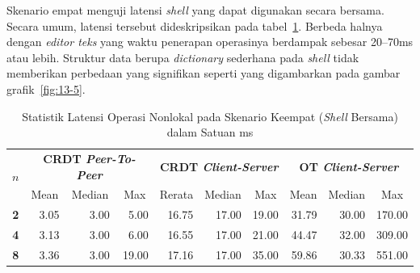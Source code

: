 Skenario empat menguji latensi \textit{shell} yang dapat digunakan secara bersama. Secara umum, latensi tersebut dideskripsikan pada tabel~\ref{tab:latency-4}. Berbeda halnya dengan \textit{editor teks} yang waktu penerapan operasinya berdampak sebesar 20--70ms atau lebih. Struktur data berupa \textit{dictionary} sederhana pada \textit{shell} tidak memberikan perbedaan yang signifikan seperti yang digambarkan pada gambar grafik~\ref{fig:13-5}.

\begin{table}[H]
 \centering
\begin{tabular}{|c|rrr|rrr|rrr|}
\hline
\multirow{2}{*}{$n$} & \multicolumn{3}{c|}{\textbf{CRDT \textit{Peer-To-Peer}}} & \multicolumn{3}{c|}{\textbf{CRDT \textit{Client-Server}}} & \multicolumn{3}{c|}{\textbf{OT \textit{Client-Server}}} \\ \cline{2-10}
 & \multicolumn{1}{c|}{Mean} & \multicolumn{1}{c|}{Median} & \multicolumn{1}{c|}{Max} & \multicolumn{1}{c|}{Rerata} & \multicolumn{1}{c|}{Median} & \multicolumn{1}{c|}{Max} & \multicolumn{1}{c|}{Mean} & \multicolumn{1}{c|}{Median} & \multicolumn{1}{c|}{Max} \\ \hline
\textbf{2} & \multicolumn{1}{r|}{3.05} & \multicolumn{1}{r|}{3.00} & 5.00 & \multicolumn{1}{r|}{16.75} & \multicolumn{1}{r|}{17.00} & 19.00 & \multicolumn{1}{r|}{31.79} & \multicolumn{1}{r|}{30.00} & 170.00 \\ \hline
\textbf{4} & \multicolumn{1}{r|}{3.13} & \multicolumn{1}{r|}{3.00} & 6.00 & \multicolumn{1}{r|}{16.55} & \multicolumn{1}{r|}{17.00} & 21.00 & \multicolumn{1}{r|}{44.47} & \multicolumn{1}{r|}{32.00} & 309.00 \\ \hline
\textbf{8} & \multicolumn{1}{r|}{3.36} & \multicolumn{1}{r|}{3.00} & 19.00 & \multicolumn{1}{r|}{17.16} & \multicolumn{1}{r|}{17.00} & 35.00 & \multicolumn{1}{r|}{59.86} & \multicolumn{1}{r|}{30.33} & 551.00 \\ \hline
\end{tabular}
 \caption{Statistik Latensi Operasi Nonlokal pada Skenario Keempat (\textit{Shell} Bersama) dalam Satuan ms}
 \label{tab:latency-4}
\end{table}

